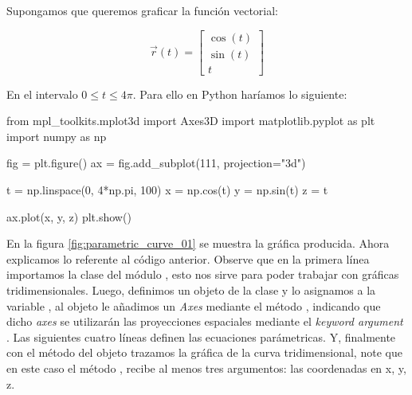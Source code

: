 Supongamos que queremos graficar la función vectorial:

$$ \vec{r}(t) = \begin{bmatrix}
\cos(t) \\ \sin(t) \\ t	
\end{bmatrix} $$

En el intervalo $ 0 \leq t \leq 4\pi $. Para ello en Python haríamos lo siguiente:

\begin{python}
from mpl_toolkits.mplot3d import Axes3D
import matplotlib.pyplot as plt
import numpy as np

fig = plt.figure()
ax = fig.add_subplot(111, projection="3d")

t = np.linspace(0, 4*np.pi, 100)
x = np.cos(t)
y = np.sin(t)
z = t

ax.plot(x, y, z)
plt.show()
\end{python}

En la figura \ref{fig:parametric_curve_01} se muestra la gráfica producida. Ahora explicamos lo referente al código 
anterior. Observe que en la primera línea importamos la clase  del módulo , 
esto nos sirve para poder trabajar con gráficas tridimensionales. Luego, definimos un objeto de la 
clase  y lo asignamos a la variable , al objeto  le añadimos un 
\textit{Axes} mediante el método , indicando que dicho \textit{axes} se utilizarán las 
proyecciones espaciales mediante el \textit{keyword argument} . Las siguientes cuatro líneas 
definen las ecuaciones parámetricas. Y, finalmente con el método  del objeto  trazamos la 
gráfica de la curva tridimensional, note que en este caso el método , recibe al menos tres argumentos: 
las coordenadas en x, y, z.

